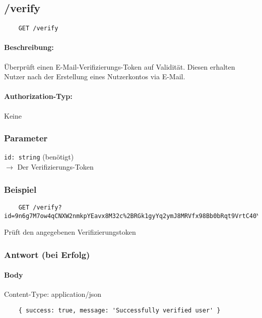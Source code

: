 \subsection{/verify}

\begin{lstlisting}
    GET /verify
\end{lstlisting}

\paragraph{Beschreibung:} Überprüft einen E-Mail-Verifizierungs-Token auf Validität. Diesen erhalten Nutzer nach der Erstellung eines Nutzerkontos via E-Mail.

\paragraph{Authorization-Typ:}
Keine

\subsubsection{Parameter}

\lstinline{id: string} (benötigt) \\
$\rightarrow$ Der Verifizierungs-Token

\subsubsection{Beispiel}

\begin{lstlisting}
    GET /verify?id=9n6g7M7ow4qCNXW2nmkpYEavx8M32c%2BRGk1gyYq2ymJ8MRVfx98Bb0bRqt9VrtC40YcqKWpRk86FAShSH4zhQ%3D%3D
\end{lstlisting}

Prüft den angegebenen Verifizierungstoken

\subsubsection{Antwort (bei Erfolg)}

\paragraph{Body}
Content-Type: application/json
\begin{lstlisting}
    { success: true, message: 'Successfully verified user' }
\end{lstlisting}